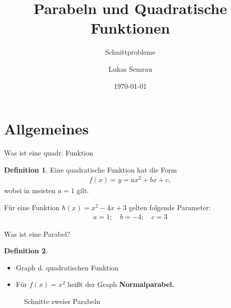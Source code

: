 \documentclass[10pt,aspectratio=169]{beamer}
\title[Parabeln]{Parabeln und Quadratische Funktionen}
\subtitle[Schnitte]{Schnittprobleme}
\author{Lukas Semrau } %
\institute[] %
{\noindent
  \textit{lukas@lukas-semrau.de}
}
\date{\dmydate\today} %
\theoremstyle{definition}
\theoremstyle{definition}
\newtheorem{defi}{Definition}[section]
\theoremstyle{definition}
\theoremstyle{definition}
\theoremstyle{remark}
\theoremstyle{definition}
\begin{document}
{
  \begin{frame}
    \titlepage
   \end{frame}
}
\section{Allgemeines}
\begin{frame}{Was ist eine quadr. Funktion}
    \begin{defi}
    Eine quadratische Funktion hat die Form \begin{align}
        f(x)=y=ax^2+bx+c,
    \end{align} wobei in meisten $a=1$ gilt.
    \end{defi}
    \pause
    Für eine Funktion $h(x)=x^2-4x+3$ gelten folgende Parameter: \pause
    \begin{align*}
        a=1;\quad b = -4; \quad c = 3
    \end{align*}
\end{frame}
\begin{frame}{Was ist eine Parabel?}
\begin{defi}
    \begin{itemize}
        \item Graph d. quadratischen Funktion \pause
        \item Für $f(x)=x^2$ heißt der Graph \textbf{Normalparabel.}
    \end{itemize}
\end{defi}
    \pause 
    \begin{figure}
    \centering
    \caption{Schnitte zweier Parabeln}
    \label{fig:schnitt}
\end{figure}
\end{frame}
\end{document}
